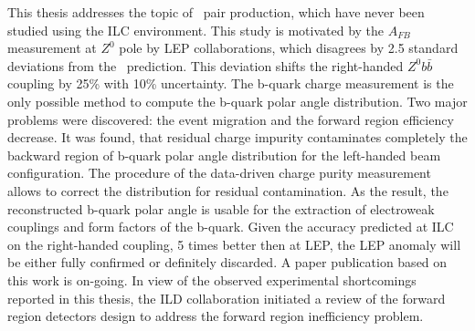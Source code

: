 This thesis addresses the topic of \bbbar\ pair production, which have never been studied using the ILC environment. 
This study is motivated by the $A_{FB}$ measurement at $Z^0$ pole by LEP collaborations, which disagrees by 2.5 standard deviations from the \sm\ prediction.
This deviation shifts the right-handed $Z^0b\bar{b}$ coupling by 25\% with 10\% uncertainty.
The b-quark charge measurement is the only possible method to compute the b-quark polar angle distribution. 
Two major problems were discovered: the event migration and the forward region efficiency decrease. 
It was found, that residual charge impurity contaminates completely the backward region of b-quark polar angle distribution for the left-handed beam configuration.
The procedure of the data-driven charge purity measurement allows to correct the distribution for residual contamination. 
As the result, the reconstructed b-quark polar angle is usable for the extraction of electroweak couplings and form factors of the b-quark. 
Given the accuracy predicted at ILC on the right-handed coupling, 5 times better then at LEP, the LEP anomaly will be either fully confirmed or definitely discarded. 
A paper publication based on this work is on-going.
In view of the observed experimental shortcomings reported in this thesis, the ILD collaboration initiated a review of the forward region detectors design to address the forward region inefficiency problem.

